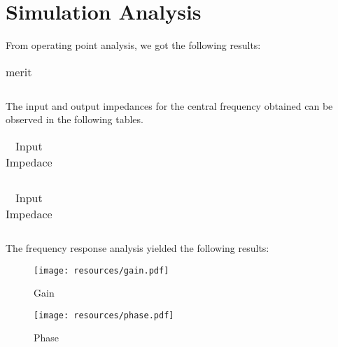 \section{Simulation Analysis}
\label{sec:simulation} 

From operating point analysis, we got the following results:
\FloatBarrier
\begin{table}[h]
  \centering
  \begin{tabular}{|c|c|c|c|}
    \hline    
    
    \hline
  \end{tabular}
  \caption{merit}
  \label{tab:Spice1}
\end{table}
\FloatBarrier  

The input and output impedances for the central frequency obtained can be observed in the following tables.

\FloatBarrier
\begin{table}[h]
  \centering
  \begin{tabular}{|c|c|c|}
    \hline    
    
    \hline
  \end{tabular}
  \caption{Input Impedace}
  \label{tab:Spice1}
\end{table}
\FloatBarrier 
  
\FloatBarrier
\begin{table}[h]
  \centering
  \begin{tabular}{|c|c|}
    \hline    
    
    \hline
  \end{tabular}
  \caption{Input Impedace}
  \label{tab:Spice1}
\end{table}
\FloatBarrier  

The frequency response analysis yielded the following results:
\FloatBarrier  
\begin{figure} [!htb] 
  \texttt{[image: resources/gain.pdf]}
  \caption{Gain}
  \label{fig:theoplots}
  \hfill
\end{figure}
\FloatBarrier  

\begin{figure} [!htb] 
  \texttt{[image: resources/phase.pdf]}
  \caption{Phase}
  \label{fig:theoplots}
  \endminipage\hfill
\end{figure}

\FloatBarrier

